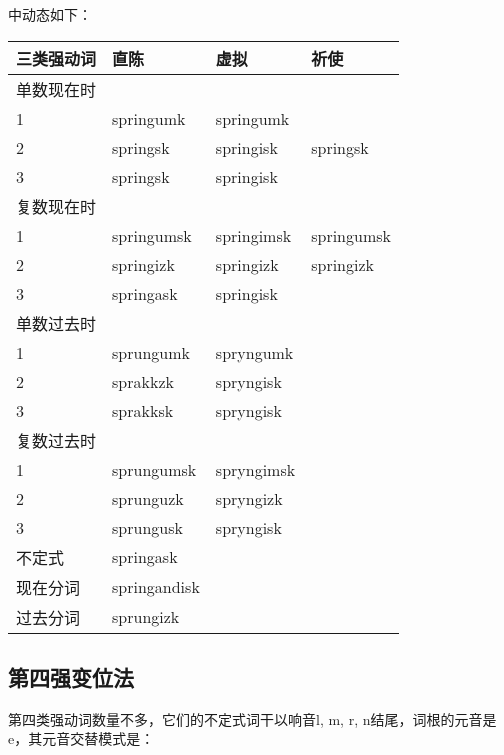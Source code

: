 中动态如下：

\begin{longtable}{llll}
    \toprule
    三类强动词 & 直陈         & 虚拟       & 祈使       \\
    \midrule
    \endhead
    \bottomrule
    \endfoot
    单数现在时 &              &            &            \\
    1          & springumk    & springumk  &            \\
    2          & springsk     & springisk  & springsk   \\
    3          & springsk     & springisk  &            \\
    复数现在时 &              &            &            \\
    1          & springumsk   & springimsk & springumsk \\
    2          & springizk    & springizk  & springizk  \\
    3          & springask    & springisk  &            \\
    单数过去时 &              &            &            \\
    1          & sprungumk    & spryngumk  &            \\
    2          & sprakkzk     & spryngisk  &            \\
    3          & sprakksk     & spryngisk  &            \\
    复数过去时 &              &            &            \\
    1          & sprungumsk   & spryngimsk &            \\
    2          & sprunguzk    & spryngizk  &            \\
    3          & sprungusk    & spryngisk  &            \\
    不定式     & springask    &            &            \\
    现在分词   & springandisk &            &            \\
    过去分词   & sprungizk    &            &            \\
\end{longtable}

\subsection{第四强变位法}\label{第四强变位法}

第四类强动词数量不多，它们的不定式词干以响音l, m, r, n结尾，词根的元音是e，其元音交替模式是：

